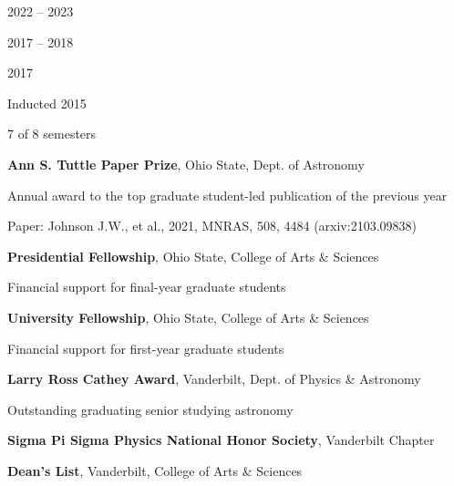 \documentclass[cv.tex]{subfiles}
\begin{document}
\parbox{0.18\textwidth}{%
	 \par
	\null \par
	\null \par
	2022 -- 2023 \par
	\null \par
	2017 -- 2018 \par
	\null \par
	2017 \par
	\null \par
	Inducted 2015 \par
	7 of 8 semesters
}
\hspace{1mm}
\parbox{0.8\textwidth}{%
	\vspace{1mm}
	\textbf{Ann S. Tuttle Paper Prize}, Ohio State, Dept. of Astronomy \par
	Annual award to the top graduate student-led publication of the previous
	year \par
	Paper: Johnson J.W., et al., 2021, MNRAS, 508, 4484 (arxiv:2103.09838) \par
	\textbf{Presidential Fellowship}, Ohio State, College of Arts \& Sciences
	\par
	Financial support for final-year graduate students \par
	\textbf{University Fellowship}, Ohio State, College of Arts \& Sciences \par
	Financial support for first-year graduate students \par
	\textbf{Larry Ross Cathey Award}, Vanderbilt, Dept. of Physics \& Astronomy
	\par
	Outstanding graduating senior studying astronomy \par
	\textbf{Sigma Pi Sigma Physics National Honor Society}, Vanderbilt Chapter
	\par
	\textbf{Dean's List}, Vanderbilt, College of Arts \& Sciences
}
\end{document}
